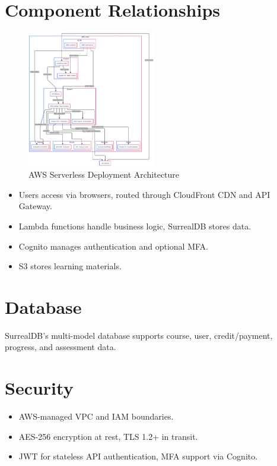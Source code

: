 \documentclass[a4paper, 11pt]{scrreprt}
\begin{document}
\section{Component Relationships}
\begin{figure}[!htb]
    \centering
    \includegraphics[width=0.5\textwidth]{serverless_deployment.png}
    \caption{AWS Serverless Deployment Architecture}
\end{figure}

\begin{itemize}
    \item Users access via browsers, routed through CloudFront CDN and API Gateway.
    \item Lambda functions handle business logic, SurrealDB stores data.
    \item Cognito manages authentication and optional MFA.
    \item S3 stores learning materials.
\end{itemize}

\section{Database}
SurrealDB's multi-model database supports course, user, credit/payment, progress, and assessment data.

\section{Security}
\begin{itemize}
    \item AWS-managed VPC and IAM boundaries.
    \item AES-256 encryption at rest, TLS 1.2+ in transit.
    \item JWT for stateless API authentication, MFA support via Cognito.
\end{itemize}
\end{document}
